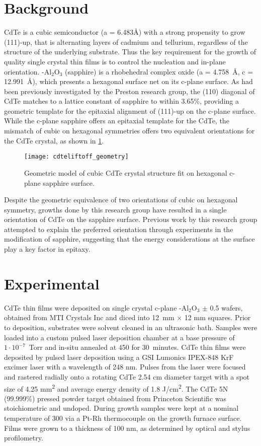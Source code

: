 \section{Background}
CdTe is a cubic semiconductor (a = 6.483\AA{}) with a strong propensity to grow (111)-up, that is alternating layers of cadmium and tellurium, regardless of the structure of the underlying substrate.
Thus the key requirement for the growth of quality single crystal thin films is to control the nucleation and in-plane orientation. \textalpha-Al\(_2\)O\(_3\) (sapphire) is a rhobehedral complex oxide (a = 4.758~\AA{}, c = 12.991~\AA{}), which presents a hexagonal surface net on its c-plane surface.
As had been previously investigated by the Preston research group, the (110) diagonal of CdTe matches to a lattice constant of sapphire to within 3.65\%, providing a geometric template for the epitaxial alignment of (111)-up on the 
c-plane surface.
While the c-plane sapphire offers an epitaxial template for the CdTe, the mismatch of cubic on hexagonal symmetries offers two equivalent orientations for the CdTe crystal, as shown in \cref{fig:cdteliftoff_geometry}.
\begin{figure}
 \centering \texttt{[image: cdteliftoff\_geometry]}
 \caption{\label{fig:cdteliftoff_geometry}Geometric model of cubic CdTe crystal structure fit on hexagonal c-plane sapphire surface.}
\end{figure}
Despite the geometric equivalence of two orientations of cubic on hexagonal symmetry, growths done by this research group have resulted in a single orientation of CdTe on the sapphire surface.
Previous work by this research group attempted to explain the preferred orientation through experiments in the modification of sapphire\cite{Neretina2009b}, suggesting that the energy considerations at the surface play a key factor in epitaxy.
\section{Experimental}
CdTe thin films were deposited on single crystal c-plane \textalpha-Al\(_2\)O\(_3\) \(\pm\) 0.5\degree{} wafers, obtained from MTI Crystals Inc and diced into 12~mm \(\times\) 12 mm squares.
Prior to deposition, substrates were solvent cleaned in an ultrasonic bath.
Samples were loaded into a custom pulsed laser deposition chamber at a base pressure of \(1\cdot10^{-7}\)~Torr and in-situ annealed at 450\celsius{} for 30~minutes.
CdTe thin films were deposited by pulsed laser deposition using a GSI Lumonics IPEX-848 KrF excimer laser with a wavelength of 248 nm.
Pulses from the laser were focused and rastered radially onto a rotating CdTe 2.54 cm diameter target with a spot size of 4.25 mm\textsuperscript{2} and average energy density of 1.8 J/cm\textsuperscript{2}.
The CdTe 5N (99.999\%) pressed powder 
target obtained from Princeton Scientific was stoichiometric and undoped.
During growth samples were kept at a nominal temperature of 300\celsius{} via a Pt-Rh thermocouple on the growth furnace surface.
Films were grown to a thickness of 100 nm, as determined by optical and stylus profilometry.

